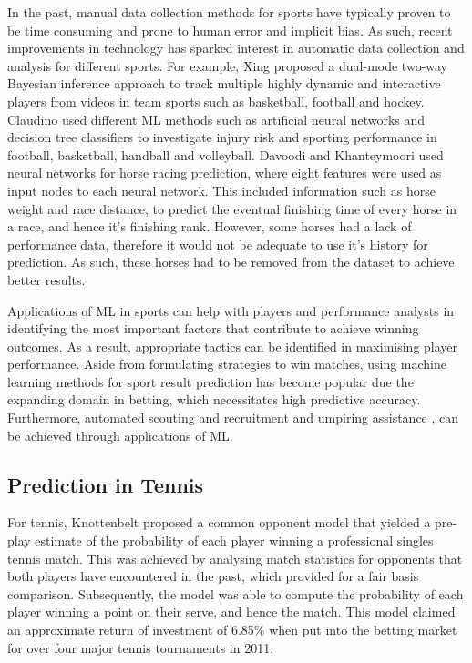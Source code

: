 In the past, manual data collection methods for sports have typically proven to be time consuming and prone to human error and implicit bias. As such, recent improvements in technology has sparked interest in automatic data collection and analysis for different sports.
For example, Xing \etal \cite{xing2010multiple} proposed a dual-mode two-way Bayesian inference approach to track multiple highly dynamic and interactive players from videos in team sports such as basketball, football and hockey. Claudino \etal \cite{claudino2019current} used different ML methods such as artificial neural networks and decision tree classifiers to investigate injury risk and sporting performance in football, basketball, handball and volleyball. Davoodi and Khanteymoori \cite{davoodi2010horse} used neural networks for horse racing prediction, where eight features were used as input nodes to each neural network. This included information such as horse weight and race distance, to predict the eventual finishing time of every horse in a race, and hence it's finishing rank. However, some horses had a lack of performance data, therefore it would not be adequate to use it's history for prediction. As such, these horses had to be removed from the dataset to achieve better results.

Applications of ML in sports can help with players and performance analysts in identifying the most important factors that contribute to achieve winning outcomes. As a result, appropriate tactics can be identified in maximising player performance.
Aside from formulating strategies to win matches, using machine learning methods for sport result prediction has become popular due the expanding domain in betting, which necessitates high predictive accuracy. Furthermore, automated scouting and recruitment \cite{bunker2019machine} and umpiring assistance \cite{vzemgulys2018recognition}, can be achieved through applications of ML.


\subsection{Prediction in Tennis}
For tennis, Knottenbelt \etal \cite{knottenbelt2012common} proposed a common opponent model that yielded a pre-play estimate of the probability of each player winning a professional singles tennis match. This was achieved by analysing match statistics for opponents that both players have encountered in the past, which provided for a fair basis comparison. Subsequently, the model was able to compute the probability of each player winning a point on their serve, and hence the match. This model claimed an approximate return of investment of 6.85\% when put into the betting market for over four major tennis tournaments in 2011.

